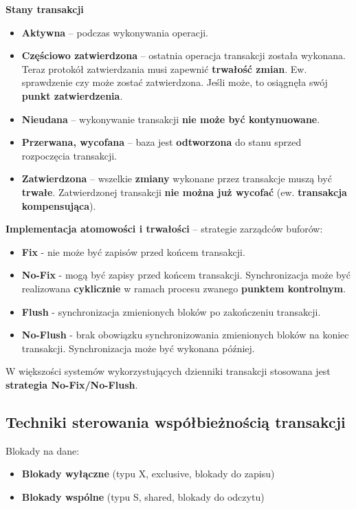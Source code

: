 \documentclass[main.tex]{subfiles}
\begin{document}
    \noindent \textbf{Stany transakcji}
    \begin{itemize}[noitemsep]
        \item \textbf{Aktywna} – podczas wykonywania operacji.
        \item \textbf{Częściowo zatwierdzona} – ostatnia operacja transakcji została wykonana. Teraz protokół zatwierdzania musi zapewnić \textbf{trwałość zmian}. Ew. sprawdzenie czy może zostać zatwierdzona. Jeśli może, to osiągnęła swój \textbf{punkt zatwierdzenia}.

        \item \textbf{Nieudana} – wykonywanie transakcji \textbf{nie może być kontynuowane}.

        \item \textbf{Przerwana, wycofana} – baza jest \textbf{odtworzona} do stanu sprzed rozpoczęcia transakcji.
        \item \textbf{Zatwierdzona} – wszelkie \textbf{zmiany} wykonane przez transakcje muszą być \textbf{trwałe}. Zatwierdzonej transakcji \textbf{nie można już wycofać} (ew. \textbf{transakcja kompensująca}).
    \end{itemize}

    \noindent \textbf{Implementacja atomowości i trwałości} -- strategie zarządców buforów:
    \begin{itemize}[noitemsep]
        \item \textbf{Fix} - nie może być zapisów przed końcem transakcji.
        \item \textbf{No-Fix} - mogą być zapisy przed końcem transakcji. Synchronizacja może być realizowana \textbf{cyklicznie} w ramach procesu zwanego \textbf{punktem kontrolnym}.\\

        \item \textbf{Flush} - synchronizacja zmienionych bloków po zakończeniu transakcji.
        \item \textbf{No-Flush} - brak obowiązku synchronizowania zmienionych bloków na koniec transakcji. Synchronizacja może być wykonana później.
    \end{itemize}
    W większości systemów wykorzystujących dzienniki transakcji stosowana jest \textbf{strategia No-Fix/No-Flush}.


    \subsection{Techniki sterowania współbieżnością transakcji}
    Blokady na dane:
    \begin{itemize}[noitemsep]
        \item \textbf{Blokady wyłączne} (typu X, exclusive, blokady do zapisu)
        \item \textbf{Blokady wspólne} (typu S, shared, blokady do odczytu)
    \end{itemize}
\end{document}
